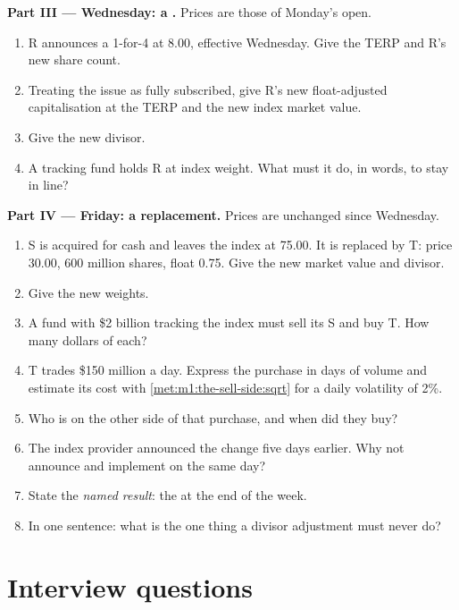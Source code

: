 \begin{problem}
\medskip\noindent\textbf{Part III --- Wednesday: a .}
Prices are those of Monday's open.
\begin{enumerate}[resume]
\item R announces a 1-for-4  at 8.00, effective Wednesday. Give
the TERP and R's new share count.
\item Treating the issue as fully subscribed, give R's new float-adjusted
capitalisation at the TERP and the new index market value.
\item Give the new divisor.
\item A tracking fund holds R at index weight. What must it do, in words,
to stay in line?
\end{enumerate}

\medskip\noindent\textbf{Part IV --- Friday: a replacement.}
Prices are unchanged since Wednesday.
\begin{enumerate}[resume]
\item S is acquired for cash and leaves the index at 75.00. It is replaced
by T: price 30.00, 600 million shares, float 0.75. Give the new market value
and divisor.
\item Give the new weights.
\item A fund with \$2 billion tracking the index must sell its S and buy T.
How many dollars of each?
\item T trades \$150 million a day. Express the purchase in days of volume
and estimate its cost with \cref{met:m1:the-sell-side:sqrt} for a daily
volatility of 2\%.
\item Who is on the other side of that purchase, and when did they buy?
\item The index provider announced the change five days earlier. Why not
announce and implement on the same day?
\item State the \emph{named result}: the  at the end of the
week.
\item In one sentence: what is the one thing a divisor adjustment must never
do?
\end{enumerate}
\end{problem}

\section{Interview questions}

